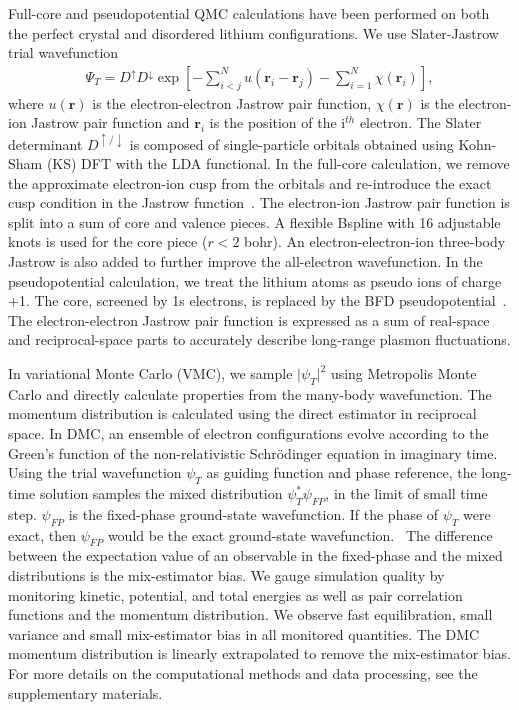 \documentclass[aps,prb,showpacs,preprintnumbers,amsmath,amssymb,superscriptaddress,twocolumn]{revtex4-1}
\newcommand{\bs}{\boldsymbol}
\newcommand{\up}{\uparrow}
\newcommand{\down}{\downarrow}
\begin{document}
Full-core and pseudopotential QMC calculations have been performed on both  the perfect crystal and disordered lithium configurations. %
We use Slater-Jastrow trial wavefunction
\begin{align}
\Psi_T = D^{\up} D^{\down} \exp\left[ -\sum\limits_{i<j}^{N} u(\bs{r}_i-\bs{r}_j) - \sum\limits_{i=1}^N \chi(\bs{r}_i) \right],\label{eq:sj}
\end{align}
where $u(\bs{r})$ is the electron-electron Jastrow pair function, $\chi(\bs{r})$ is the electron-ion Jastrow pair function and $\bs{r}_i$ is the position of the i$^{th}$ electron. The Slater determinant $D^{\up/\down}$ is composed of single-particle orbitals obtained using Kohn-Sham (KS) DFT with the LDA functional. In the full-core calculation, we remove the approximate electron-ion cusp from the orbitals and re-introduce the exact cusp condition in the Jastrow function~\cite{Ceperley1981}. The electron-ion Jastrow pair function is split into a sum of core and valence pieces. A flexible Bspline with 16 adjustable knots is used for the core piece ($r<2$ bohr). An electron-electron-ion three-body Jastrow is also added to further improve the all-electron wavefunction. In the pseudopotential calculation, we treat the lithium atoms as pseudo ions of charge +1. The core, screened by 1s electrons, is replaced by the BFD pseudopotential~\cite{Burkatzki2007}.  The electron-electron Jastrow pair function is expressed as a sum of real-space and reciprocal-space parts to accurately describe long-range plasmon fluctuations.

In variational Monte Carlo (VMC), we sample $\vert \psi_T \vert^2$ using Metropolis Monte Carlo and directly calculate properties from the many-body wavefunction. The momentum distribution is calculated using the direct estimator in reciprocal space\cite{McMillan1965}. In DMC, an ensemble of electron configurations evolve according to the Green's function of the non-relativistic Schr\"odinger equation in imaginary time. Using the trial wavefunction $\psi_T$ as guiding function and phase reference, the long-time solution samples the mixed distribution $\psi^*_T\psi_{FP}$, in the limit of small time step. $\psi_{FP}$ is the fixed-phase ground-state wavefunction. If the phase of $\psi_T$ were exact, then $\psi_{FP}$ would be the exact ground-state wavefunction.~\cite{Ortiz1993} The difference between the expectation value of an observable in the fixed-phase and the mixed distributions is the mix-estimator bias. We gauge simulation quality by monitoring kinetic, potential, and total energies as well as pair correlation functions and the momentum distribution. We observe fast equilibration, small variance and small mix-estimator bias in all monitored quantities. The DMC momentum distribution is linearly extrapolated to remove the mix-estimator bias. For more details on the computational methods and data processing, see the supplementary materials.
\end{document}
